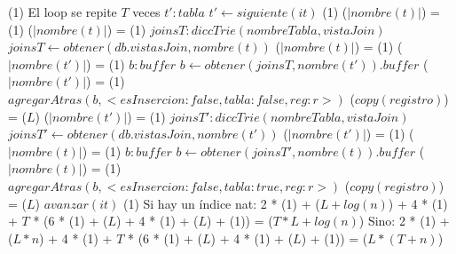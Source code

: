 {        \State
                                          \comment \bigo(1)
            \State                 \icomment El loop se repite $T$ veces
            \var $t' : tabla$
            \State $t' \gets siguiente(it)$                         \comment \bigo(1)
                                    \comment \bigo($|nombre(t)|$) = \bigo(1)
                          \comment \bigo($|nombre(t)|$) = \bigo(1)
                    \var $joinsT : diccTrie(nombreTabla, vistaJoin)$
                    \State $joinsT \gets obtener(db.vistasJoin, nombre(t))$                     \comment \bigo($|nombre(t)|$) = \bigo(1)
                                \comment \bigo($|nombre(t')|$) = \bigo(1)
                        \var $b : buffer$
                        \State $b \gets obtener(joinsT, nombre(t')).buffer$                     \comment \bigo($|nombre(t')|$) = \bigo(1)
                        \State $agregarAtras(b, <esInsercion: false, tabla: false, reg: r>)$    \comment \bigo($copy(registro)$) = \bigo($L$)
                    \EndIf
                \EndIf
                \State
                         \comment \bigo($|nombre(t')|$) = \bigo(1)
                    \var $joinsT' : diccTrie(nombreTabla, vistaJoin)$
                    \State $joinsT' \gets obtener(db.vistasJoin, nombre(t'))$                   \comment \bigo($|nombre(t')|$) = \bigo(1)
                                \comment \bigo($|nombre(t)|$) = \bigo(1)
                        \var $b : buffer$
                        \State $b \gets obtener(joinsT', nombre(t)).buffer$                     \comment \bigo($|nombre(t)|$) = \bigo(1)
                        \State $agregarAtras(b, <esInsercion: false, tabla: true, reg: r>)$     \comment \bigo($copy(registro)$) = \bigo($L$)
                    \EndIf
                \EndIf
            \EndIf
            \State $avanzar(it)$                                    \comment \bigo(1)
        \EndWhile
    \EndIf
}{Si hay un índice nat: 2 * \bigo(1) + \bigo($L + log(n)$) + 4 * \bigo(1) \\
    \hspace*{16em} + $T$ * (6 * \bigo(1) + \bigo($L$) + 4 * \bigo(1) + \bigo($L$) + \bigo(1)) = \bigo($T * L + log(n)$)
    \hspace*{8.25em} Sino: 2 * \bigo(1) + \bigo($L * n$) + 4 * \bigo(1)
    + $T$ * (6 * \bigo(1) + \bigo($L$) + 4 * \bigo(1) + \bigo($L$) + \bigo(1)) = \bigo($L * (T + n)$)
}

